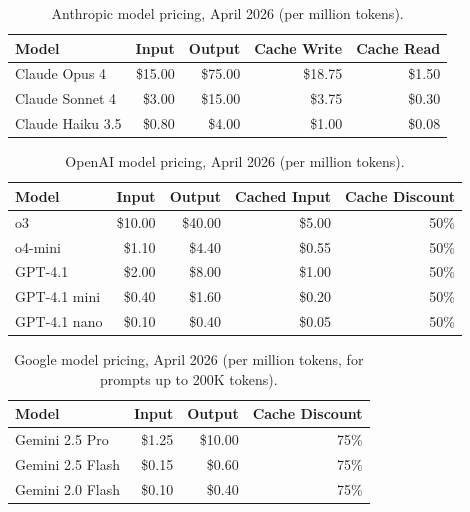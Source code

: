 \documentclass[11pt, a4paper, logo, copyright]{googledeepmind}
\begin{document}
\begin{appendices}
\begin{table}[H]
\centering
\caption{Anthropic model pricing, April 2026 (per million tokens).}
\label{tab:anthropic-pricing}
\begin{tabular}{lrrrr}
\toprule
\textbf{Model} & \textbf{Input} & \textbf{Output} & \textbf{Cache Write} & \textbf{Cache Read} \\
\midrule
Claude Opus 4 & \$15.00 & \$75.00 & \$18.75 & \$1.50 \\
Claude Sonnet 4 & \$3.00 & \$15.00 & \$3.75 & \$0.30 \\
Claude Haiku 3.5 & \$0.80 & \$4.00 & \$1.00 & \$0.08 \\
\bottomrule
\end{tabular}
\end{table}

\begin{table}[H]
\centering
\caption{OpenAI model pricing, April 2026 (per million tokens).}
\label{tab:openai-pricing}
\begin{tabular}{lrrrr}
\toprule
\textbf{Model} & \textbf{Input} & \textbf{Output} & \textbf{Cached Input} & \textbf{Cache Discount} \\
\midrule
o3 & \$10.00 & \$40.00 & \$5.00 & 50\% \\
o4-mini & \$1.10 & \$4.40 & \$0.55 & 50\% \\
GPT-4.1 & \$2.00 & \$8.00 & \$1.00 & 50\% \\
GPT-4.1 mini & \$0.40 & \$1.60 & \$0.20 & 50\% \\
GPT-4.1 nano & \$0.10 & \$0.40 & \$0.05 & 50\% \\
\bottomrule
\end{tabular}
\end{table}

\begin{table}[H]
\centering
\caption{Google model pricing, April 2026 (per million tokens, for prompts up to 200K tokens).}
\label{tab:google-pricing}
\begin{tabular}{lrrr}
\toprule
\textbf{Model} & \textbf{Input} & \textbf{Output} & \textbf{Cache Discount} \\
\midrule
Gemini 2.5 Pro & \$1.25 & \$10.00 & 75\% \\
Gemini 2.5 Flash & \$0.15 & \$0.60 & 75\% \\
Gemini 2.0 Flash & \$0.10 & \$0.40 & 75\% \\
\bottomrule
\end{tabular}
\end{table}


\end{appendices}
\end{document}
